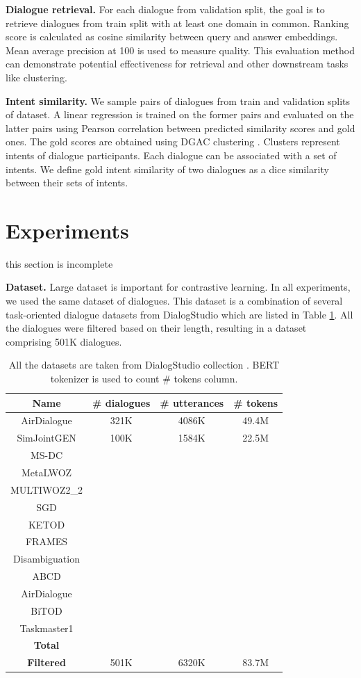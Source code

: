 \documentclass{article}
\begin{document}
\textbf{Dialogue retrieval.} For each dialogue from validation split, the goal is to retrieve dialogues from train split with at least one domain in common. Ranking score is calculated as cosine similarity between query and answer embeddings. Mean average precision at 100 is used to measure quality. This evaluation method can demonstrate potential effectiveness for retrieval and other downstream tasks like clustering.

\textbf{Intent similarity.} We sample pairs of dialogues from train and validation splits of dataset. A linear regression is trained on the former pairs and evaluated on the latter pairs using Pearson correlation between predicted similarity scores and gold ones. The gold scores are obtained using DGAC clustering \cite{dgac}. Clusters represent intents of dialogue participants. Each dialogue can be associated with a set of intents. We define gold intent similarity of two dialogues as a dice similarity between their sets of intents.

\section{Experiments}

this section is incomplete

\textbf{Dataset.} Large dataset is important for contrastive learning. In all experiments, we used the same dataset of dialogues. This dataset is a combination of several task-oriented dialogue datasets from DialogStudio \cite{zhang2023dialogstudio} which are listed in Table \ref{tab:dataset}. All the dialogues were filtered based on their length, resulting in a dataset comprising 501K dialogues.

\begin{table}[!htb]
    \centering
    \begin{tabular}{c|c|c|c}
        Name & \# dialogues & \# utterances & \# tokens \\
        \hline
        AirDialogue & 321K & 4086K & 49.4M \\
        SimJointGEN & 100K & 1584K & 22.5M \\
        MS-DC & & & \\
        MetaLWOZ & & & \\
        MULTIWOZ2\_2 & & & \\
        SGD & & & \\
        KETOD & & & \\
        FRAMES & & & \\
        Disambiguation & & & \\
        ABCD & & & \\
        AirDialogue & & & \\
        BiTOD & & & \\
        Taskmaster1 & & & \\
        \textbf{Total} & & & \\
        \textbf{Filtered} & 501K & 6320K & 83.7M
    \end{tabular}
    \caption{All the datasets are taken from DialogStudio collection \cite{zhang2023dialogstudio}. BERT tokenizer is used to count \# tokens column.}
    \label{tab:dataset}
\end{table}
\end{document}
